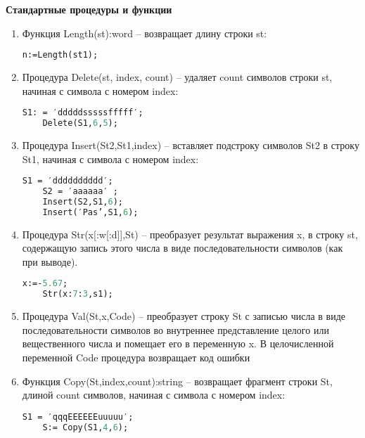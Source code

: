 \vspace*{10pt}
{\bf{Стандартные процедуры и функции}}

\begin{enumerate}
\item Функция Length(st):word – возвращает длину строки st: 

\begin{lstlisting}[language=Pascal]
	n:=Length(st1);  
\end{lstlisting} 

\item Процедура Delete(st, index, count) – удаляет count символов строки st, начиная с символа с номером index:

\begin{lstlisting}[language=Pascal]
    S1: = ′dddddsssssfffff′; 
	Delete(S1,6,5);  
\end{lstlisting} 

\item Процедура Insert(St2,St1,index) – вставляет подстроку символов St2 в строку St1, начиная с символа с номером index:

\begin{lstlisting}[language=Pascal]
	S1 = ′dddddddddd′;
	S2 = ′аааааа′ ;
	Insert(S2,S1,6);      
	Insert(′Pas’,S1,6);      
\end{lstlisting} 

\item Процедура Str(x[:w[:d]],St) – преобразует результат выражения x, в строку st, содержащую запись этого числа в виде последовательности символов (как при выводе). 

\begin{lstlisting}[language=Pascal]
	x:=-5.67;
	Str(x:7:3,s1);
\end{lstlisting} 

\item Процедура Val(St,x,Code) – преобразует строку St с записью числа в виде последовательности символов во внутреннее представление целого или вещественного числа и помещает его в переменную x.  В целочисленной переменной Code процедура возвращает код ошибки

\item Функция Copy(St,index,count):string – возвращает фрагмент строки St, длиной count символов, начиная с символа с номером index:

\begin{lstlisting}[language=Pascal]
 	S1 = ′qqqEEEEEEuuuuu′;
 	S:= Copy(S1,4,6);     
\end{lstlisting} 


\end{enumerate}

